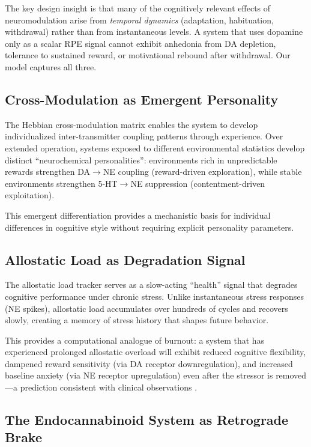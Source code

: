 \documentclass[11pt,a4paper]{article}
\begin{document}
The key design insight is that many of the cognitively relevant effects of neuromodulation arise from \emph{temporal dynamics} (adaptation, habituation, withdrawal) rather than from instantaneous levels. A system that uses dopamine only as a scalar RPE signal cannot exhibit anhedonia from DA depletion, tolerance to sustained reward, or motivational rebound after withdrawal. Our model captures all three.

\subsection{Cross-Modulation as Emergent Personality}

The Hebbian cross-modulation matrix enables the system to develop individualized inter-transmitter coupling patterns through experience. Over extended operation, systems exposed to different environmental statistics develop distinct ``neurochemical personalities'': environments rich in unpredictable rewards strengthen DA$\to$NE coupling (reward-driven exploration), while stable environments strengthen 5-HT$\to$NE suppression (contentment-driven exploitation).

This emergent differentiation provides a mechanistic basis for individual differences in cognitive style without requiring explicit personality parameters.

\subsection{Allostatic Load as Degradation Signal}

The allostatic load tracker serves as a slow-acting ``health'' signal that degrades cognitive performance under chronic stress. Unlike instantaneous stress responses (NE spikes), allostatic load accumulates over hundreds of cycles and recovers slowly, creating a memory of stress history that shapes future behavior.

This provides a computational analogue of burnout: a system that has experienced prolonged allostatic overload will exhibit reduced cognitive flexibility, dampened reward sensitivity (via DA receptor downregulation), and increased baseline anxiety (via NE receptor upregulation) even after the stressor is removed---a prediction consistent with clinical observations \citep{mcewen1998}.

\subsection{The Endocannabinoid System as Retrograde Brake}
\end{document}
